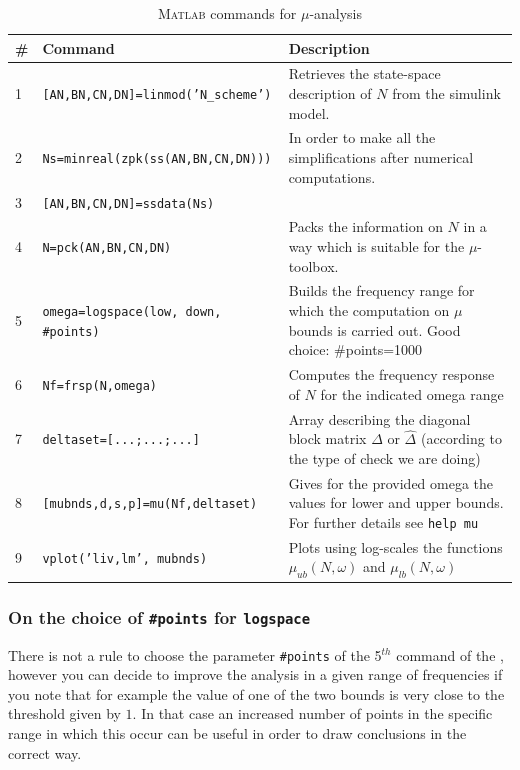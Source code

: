 \documentclass[a4paper, 12pt]{article}
\begin{document}
\begin{table}[h]
    \centering
    \begin{tabular}{p{0.5cm} p{7cm} p{8cm}}
        \textbf{\#}&\textbf{Command}&\textbf{Description}\\
        \midrule[1.5pt]
        1&\texttt{[AN,BN,CN,DN]=linmod('N\_scheme')}&{Retrieves the state-space description of $N$ from the simulink model.}\\
        \midrule
        2&\texttt{Ns=minreal(zpk(ss(AN,BN,CN,DN)))}&{In order to make all the simplifications after numerical computations.}\\
        3&\texttt{[AN,BN,CN,DN]=ssdata(Ns)}&\\
        \midrule
        4&\texttt{N=pck(AN,BN,CN,DN)}&{Packs the information on $N$ in a way which is suitable for the $\mu$-toolbox.}\\
        \midrule
        5&\texttt{omega=logspace(low, down, \#points)}&{Builds the frequency range for which the computation on $\mu$ bounds is carried out. Good choice: \#points=1000}\\
        \midrule
        6&\texttt{Nf=frsp(N,omega)}&{Computes the frequency response of $N$ for the indicated omega range}\\
        \midrule
        7&\texttt{deltaset=[...;...;...]}&{Array describing the diagonal block matrix $\Delta$ or $\hat{\Delta}$} (according to the type of check we are doing)\\
        \midrule
        8&\texttt{[mubnds,d,s,p]=mu(Nf,deltaset)}&{Gives for the provided omega the values for lower and upper bounds. For further details see \texttt{help mu}}\\
        \midrule
        9&\texttt{vplot('liv,lm', mubnds)}&{Plots using log-scales the functions $\mu_{ub}(N,\omega)$ and $\mu_{lb}(N,\omega)$ }
        
    \end{tabular}
    \caption{\textsc{Matlab} commands for $\mu$-analysis}
    \label{tab:mu_commands}
\end{table}

\subsubsection{On the choice of \texttt{\#points} for \texttt{logspace}}
There is not a rule to choose the parameter \texttt{\#points} of the 5$^{th}$ command of the , however you can decide to improve the analysis in a given range of frequencies if you note that for example the value of one of the two bounds is very close to the threshold given by $1$. In that case an increased number of points in the specific range in which this occur can be useful in order to draw conclusions in the correct way.
\end{document}
